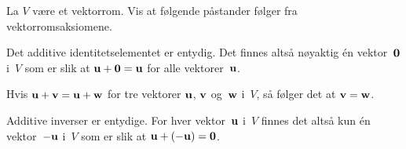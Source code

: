\begin{oppgave}
La $V$ være et vektorrom.
Vis at følgende påstander følger fra vektorromsaksiomene.
\begin{punkt}
Det additive identitetselementet er entydig.  Det finnes altså
nøyaktig én vektor~$\mathbf{0}$ i~$V$ som er slik at
$\mathbf{u} + \mathbf{0} = \mathbf{u}$ for alle vektorer~$\mathbf{u}$.
\end{punkt}
\begin{punkt}
Hvis $\mathbf{u} + \mathbf{v} = \mathbf{u} + \mathbf{w}$ for tre vektorer $\mathbf{u}$, $\mathbf{v}$
og~$\mathbf{w}$ i~$V$, så følger det at $\mathbf{v} = \mathbf{w}$.
\end{punkt}
\begin{punkt}
Additive inverser er entydige.  For hver vektor~$\mathbf{u}$ i~$V$ finnes
det altså kun én vektor~$-\mathbf{u}$ i~$V$ som er slik at
$\mathbf{u} + (-\mathbf{u}) = \mathbf{0}$.
\end{punkt}
\end{oppgave}

